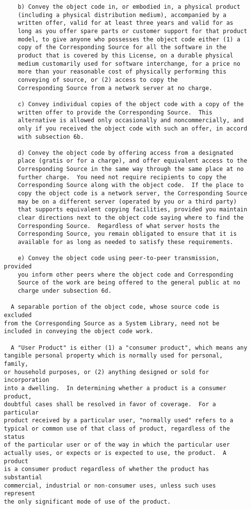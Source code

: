 \documentclass[11pt]{article}
\begin{document}
\begin{verbatim}
    b) Convey the object code in, or embodied in, a physical product
    (including a physical distribution medium), accompanied by a
    written offer, valid for at least three years and valid for as
    long as you offer spare parts or customer support for that product
    model, to give anyone who possesses the object code either (1) a
    copy of the Corresponding Source for all the software in the
    product that is covered by this License, on a durable physical
    medium customarily used for software interchange, for a price no
    more than your reasonable cost of physically performing this
    conveying of source, or (2) access to copy the
    Corresponding Source from a network server at no charge.

    c) Convey individual copies of the object code with a copy of the
    written offer to provide the Corresponding Source.  This
    alternative is allowed only occasionally and noncommercially, and
    only if you received the object code with such an offer, in accord
    with subsection 6b.

    d) Convey the object code by offering access from a designated
    place (gratis or for a charge), and offer equivalent access to the
    Corresponding Source in the same way through the same place at no
    further charge.  You need not require recipients to copy the
    Corresponding Source along with the object code.  If the place to
    copy the object code is a network server, the Corresponding Source
    may be on a different server (operated by you or a third party)
    that supports equivalent copying facilities, provided you maintain
    clear directions next to the object code saying where to find the
    Corresponding Source.  Regardless of what server hosts the
    Corresponding Source, you remain obligated to ensure that it is
    available for as long as needed to satisfy these requirements.

    e) Convey the object code using peer-to-peer transmission, provided
    you inform other peers where the object code and Corresponding
    Source of the work are being offered to the general public at no
    charge under subsection 6d.

  A separable portion of the object code, whose source code is excluded
from the Corresponding Source as a System Library, need not be
included in conveying the object code work.

  A "User Product" is either (1) a "consumer product", which means any
tangible personal property which is normally used for personal, family,
or household purposes, or (2) anything designed or sold for incorporation
into a dwelling.  In determining whether a product is a consumer product,
doubtful cases shall be resolved in favor of coverage.  For a particular
product received by a particular user, "normally used" refers to a
typical or common use of that class of product, regardless of the status
of the particular user or of the way in which the particular user
actually uses, or expects or is expected to use, the product.  A product
is a consumer product regardless of whether the product has substantial
commercial, industrial or non-consumer uses, unless such uses represent
the only significant mode of use of the product.


\end{verbatim}
\end{document}

